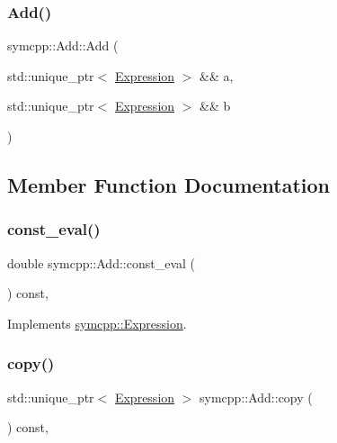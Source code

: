 \subsubsection{\texorpdfstring{Add()}{Add()}\hspace{0.1cm}{\footnotesize\ttfamily [2/2]}}
{\footnotesize\ttfamily symcpp\+::\+Add\+::\+Add (\begin{DoxyParamCaption}\item[{std\+::unique\+\_\+ptr$<$ \mbox{\hyperlink{classsymcpp_1_1Expression}{Expression}} $>$ \&\&}]{a,  }\item[{std\+::unique\+\_\+ptr$<$ \mbox{\hyperlink{classsymcpp_1_1Expression}{Expression}} $>$ \&\&}]{b }\end{DoxyParamCaption})}



\subsection{Member Function Documentation}
\mbox{\label{classsymcpp_1_1Add_af3e5c83af088ffc00849e852e18b055c}} 
\subsubsection{\texorpdfstring{const\_eval()}{const\_eval()}}
{\footnotesize\ttfamily double symcpp\+::\+Add\+::const\+\_\+eval (\begin{DoxyParamCaption}{ }\end{DoxyParamCaption}) const\hspace{0.3cm}{\ttfamily [override]}, {\ttfamily [virtual]}}



Implements \mbox{\hyperlink{classsymcpp_1_1Expression_a81c8069347f586cb5632338d97c278ad}{symcpp\+::\+Expression}}.

\mbox{\label{classsymcpp_1_1Add_a58633f0c101ef1e7cc3952846054d27f}} 
\subsubsection{\texorpdfstring{copy()}{copy()}}
{\footnotesize\ttfamily std\+::unique\+\_\+ptr$<$ \mbox{\hyperlink{classsymcpp_1_1Expression}{Expression}} $>$ symcpp\+::\+Add\+::copy (\begin{DoxyParamCaption}{ }\end{DoxyParamCaption}) const\hspace{0.3cm}{\ttfamily [override]}, {\ttfamily [virtual]}}



